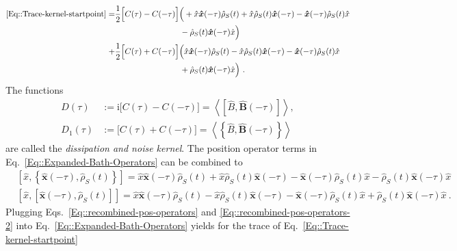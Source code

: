 	\begin{equation} \label{Eq::Expanded-Bath-Operators}
		\begin{split}
			\eqref{Eq::Trace-kernel-startpoint} =	&\frac{1}{2} \Big[C(\tau) - C(-\tau) \Big] \Big ( +\hat{x} \boldsymbol{\hat{x}}(-\tau) \hat{\rho}_S(t) + \hat{x} \hat{\rho}_S(t) \boldsymbol{\hat{x}}(-\tau) - \boldsymbol{\hat{x}}(-\tau) \hat{\rho}_S(t) \hat{x}  \\
			& \qquad \qquad \qquad \qquad -  \hat{\rho}_S(t) \boldsymbol{\hat{x}}(-\tau) \hat{x} \Big ) \\
			+& \frac{1}{2} \Big[C(\tau) + C(-\tau)\Big] \Big ( \hat{x} \boldsymbol{\hat{x}}(-\tau) \hat{\rho}_S(t) - \hat{x} \hat{\rho}_S(t) \boldsymbol{\hat{x}}(-\tau) - \boldsymbol{\hat{x}}(-\tau) \hat{\rho}_S(t) \hat{x} \\
			& \qquad \qquad \qquad \qquad + \hat{\rho}_S(t) \boldsymbol{\hat{x}}(-\tau) \hat{x} \Big) ~.
		\end{split}
	\end{equation}
	The functions
	\begin{align}
		D(\tau) &:=	\mathrm{i} \Big[C(\tau) - C(-\tau) \Big] =	\left\langle [\hat{B}, \boldsymbol{\hat{B}}(-\tau) ]  \right \rangle ,	\\
		D_1(\tau) &:= \Big[C(\tau) + C(-\tau)\Big]  =	\left \langle \left\{\hat{B}, \boldsymbol{\hat{B}}(-\tau) \right\} \right \rangle
	\end{align}
	are called the \textit{dissipation and noise kernel}.
	The position operator terms in Eq.~\eqref{Eq::Expanded-Bath-Operators} can be combined to
	\begin{align} \label{Eq::recombined-pos-operators}
		&\left[\hat{x}, \left\{\boldsymbol{\hat{x}}(-\tau),  \hat{\rho}_S(t)\right\}\right] =	\hat{x} \boldsymbol{\hat{x}}(-\tau) \hat{\rho}_S(t) + \hat{x} \hat{\rho}_S(t) \boldsymbol{\hat{x}}(-\tau) - \boldsymbol{\hat{x}}(-\tau) \hat{\rho}_S(t) \hat{x}
		-  \hat{\rho}_S(t) \boldsymbol{\hat{x}}(-\tau) \hat{x} \\
		&\left[\hat{x}, \left[\boldsymbol{\hat{x}}(-\tau),  \hat{\rho}_S(t)\right] \right] =	\hat{x} \boldsymbol{\hat{x}}(-\tau) \hat{\rho}_S(t) - \hat{x} \hat{\rho}_S(t) \boldsymbol{\hat{x}}(-\tau) - \boldsymbol{\hat{x}}(-\tau) \hat{\rho}_S(t) \hat{x}
		+  \hat{\rho}_S(t) \boldsymbol{\hat{x}}(-\tau) \hat{x}~.\label{Eq::recombined-pos-operators-2}
	\end{align}
	Plugging Eqs.~\eqref{Eq::recombined-pos-operators} and \eqref{Eq::recombined-pos-operators-2} into Eq.~\eqref{Eq::Expanded-Bath-Operators} yields for the trace of Eq.~\eqref{Eq::Trace-kernel-startpoint}
